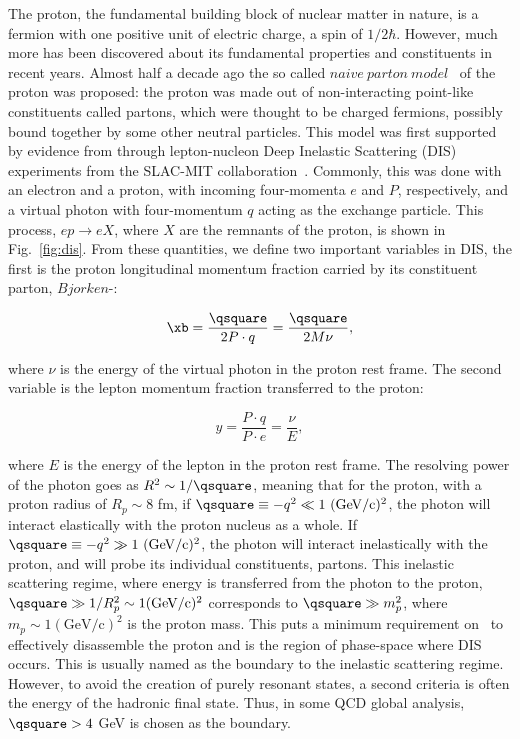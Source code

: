 The proton, the fundamental building block of nuclear matter in nature, is a fermion with one positive unit of electric charge, a spin of $1/2 \hbar$. However, much more has been discovered about its fundamental properties and constituents in recent years. Almost half a decade ago the so called $naive\ parton\ model$~\cite{Bjorken:1969ja,Peskin:1995ev} of the proton was proposed: the proton was made out of non-interacting point-like constituents called partons, which were thought to be charged fermions, possibly bound together by some other neutral particles. This model was first supported by evidence from through lepton-nucleon Deep Inelastic Scattering (DIS) experiments from the SLAC-MIT collaboration~\cite{Whitlow:1990gk}. Commonly, this was done with an electron and a proton, with incoming four-momenta $e$ and $P$, respectively, and a virtual photon with four-momentum $q$ acting as the exchange particle. This process, $ep \rightarrow eX$, where $X$ are the remnants of the proton, is shown in Fig.~\ref{fig:dis}. From these quantities, we define two important variables in DIS, the first is the proton longitudinal momentum fraction carried by its constituent parton, $Bjorken$-\xb:

\begin{equation}
\xb = \frac{\qsquare}{2P\cdot q} = \frac{\qsquare}{2M\nu},
\label{eqn:xb}
\end{equation}

where $\nu$ is the energy of the virtual photon in the proton rest frame. The second variable is the lepton momentum fraction transferred to the proton:

\begin{equation}
y = \frac{P\cdot q}{P \cdot e} = \frac{\nu}{E},
\label{eqn:ydis}
\end{equation}

where $E$ is the energy of the lepton in the proton rest frame. The resolving power of the photon goes as $R^{2} \sim 1/\qsquare$, meaning that for the proton, with a proton radius of $R_{p}\sim8$ fm, if $\qsquare \equiv -q^{2} \ll 1\ \mathrm{(GeV/c)^2}$, the photon will interact elastically with the proton nucleus as a whole. If $\qsquare \equiv -q^{2} \gg 1\ \mathrm{(GeV/c)^2}$, the photon will interact inelastically with the proton, and will probe its individual constituents, partons. This inelastic scattering regime, where energy is transferred from the photon to the proton,   $\qsquare \gg 1/R_{p}^{2} \sim 1 \mathrm{(GeV/c)^2}$ corresponds to $\qsquare \gg m_{p}^{2}$, where $m_{p} \sim 1 \mathrm{(GeV/c)^2}$ is the proton mass. This puts a minimum requirement on \qsquare\ to effectively disassemble the proton and is the region of phase-space where DIS occurs. This is usually named as the boundary to the inelastic scattering regime. However, to avoid the creation of purely resonant states, a second criteria is often the energy of the hadronic final state. Thus, in some QCD global analysis, $\qsquare>4$ GeV is chosen as the boundary.

